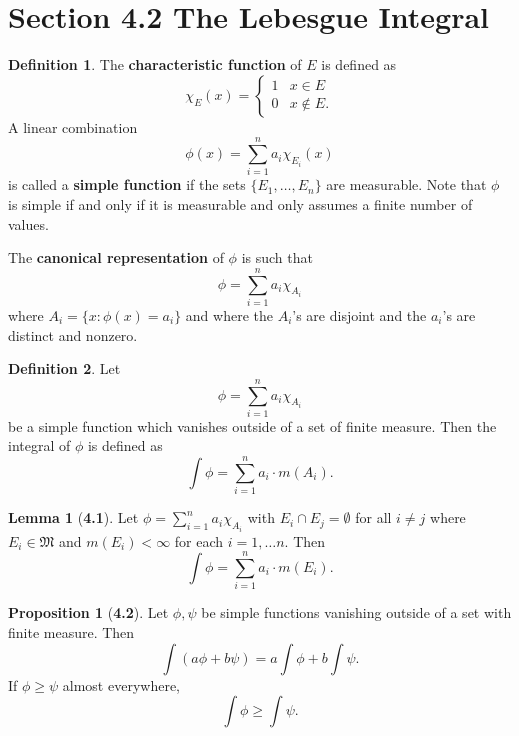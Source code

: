 \documentclass[12pt]{article}
\theoremstyle{definition}
\newtheorem*{definition}{Definition}
\newtheorem*{lemma}{Lemma}
\newtheorem*{prop}{Proposition}
\begin{document}
\section*{Section 4.2 The Lebesgue Integral}

\begin{definition}
    The \textbf{characteristic function} of \( E \) is defined as
        \[
            \chi_{E}(x) = \begin{cases}
                1 & x \in E \\
                0 & x \not\in E.
            \end{cases}  
        \]
    A linear combination 
        \[
            \phi(x) = \sum_{i=1}^{n} a_i \chi_{E_{i}}(x)  
        \]
    is called a \textbf{simple function} if the sets \( \{ E_1, \ldots, E_n \}\) are measurable. Note that \( \phi \) is simple if and only if it is measurable and only assumes a finite number of values.

    The \textbf{canonical representation} of \( \phi \) is such that 
        \[
            \phi = \sum_{i=1}^{n} a_{i} \chi_{A_{i}}    
        \]
    where \( A_i = \{ x: \phi(x) = a_i \} \) and where the \( A_i \)'s are disjoint and the \( a_i \)'s are distinct and nonzero. 
\end{definition}

\begin{definition}
    Let 
        \[
            \phi = \sum_{i=1}^{n} a_{i} \chi_{A_{i}} 
        \]
    be a simple function which vanishes outside of a set of finite measure. Then the integral of \( \phi \) is defined as
        \[
            \int \phi = \sum_{i=1}^{n} a_i \cdot m(A_i). 
        \] 
\end{definition}

\begin{lemma}[\textbf{4.1}]

    Let \( \displaystyle  \phi = \sum_{i=1}^{n} a_{i} \chi_{A_{i}}  \) with \( E_i \cap E_j = \emptyset \) for all \( i \neq j \) where \( E_i \in \mathfrak{M} \) and \( m(E_i) < \infty \) for each \( i = 1, \ldots n \). Then 
        \[
            \int \phi = \sum_{i=1}^{n} a_i \cdot m(E_i).   
        \]
    
\end{lemma}

\begin{prop}[\textbf{4.2}]

    Let \( \phi, \psi \) be simple functions vanishing outside of a set with finite measure. Then
        \[
            \int (a \phi + b \psi) = a \int \phi + b \int \psi.
        \]
    If \( \phi \geq \psi \) almost everywhere,
        \[
            \int \phi \geq \int \psi.    
        \]
\end{prop}
\end{document}
